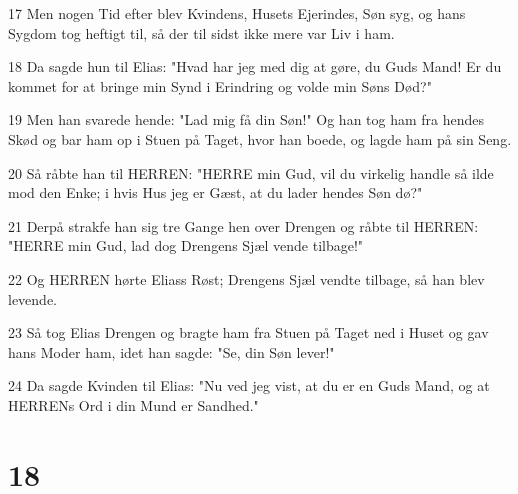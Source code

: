 \par 17 Men nogen Tid efter blev Kvindens, Husets Ejerindes, Søn syg, og hans Sygdom tog heftigt til, så der til sidst ikke mere var Liv i ham.
\par 18 Da sagde hun til Elias: "Hvad har jeg med dig at gøre, du Guds Mand! Er du kommet for at bringe min Synd i Erindring og volde min Søns Død?"
\par 19 Men han svarede hende: "Lad mig få din Søn!" Og han tog ham fra hendes Skød og bar ham op i Stuen på Taget, hvor han boede, og lagde ham på sin Seng.
\par 20 Så råbte han til HERREN: "HERRE min Gud, vil du virkelig handle så ilde mod den Enke; i hvis Hus jeg er Gæst, at du lader hendes Søn dø?"
\par 21 Derpå strakfe han sig tre Gange hen over Drengen og råbte til HERREN: "HERRE min Gud, lad dog Drengens Sjæl vende tilbage!"
\par 22 Og HERREN hørte Eliass Røst; Drengens Sjæl vendte tilbage, så han blev levende.
\par 23 Så tog Elias Drengen og bragte ham fra Stuen på Taget ned i Huset og gav hans Moder ham, idet han sagde: "Se, din Søn lever!"
\par 24 Da sagde Kvinden til Elias: "Nu ved jeg vist, at du er en Guds Mand, og at HERRENs Ord i din Mund er Sandhed."

\chapter{18}

